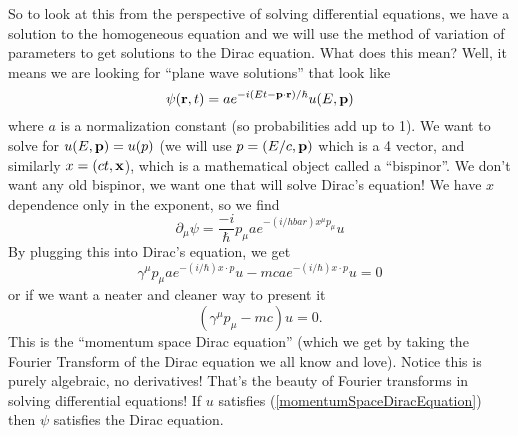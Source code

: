 So to look at this from the perspective of solving differential equations, we
have a solution to the homogeneous equation and we will use the method of variation
of parameters to get solutions to the Dirac equation. What does this mean? Well,
it means we are looking for ``plane wave solutions'' that look like
\begin{equation}
\psi(\bold{r},t) = ae^{-i(Et-\bold{p}\cdot\bold{r})/\hbar}u(E,\bold{p})
\end{equation}
where $a$ is a normalization constant (so probabilities add up to 1). We want to
solve for $u(E,\bold{p})=u(p)$ (we will use $p=(E/c,\bold{p})$ which is a 4 vector, and
similarly $x=(ct,\bold{x}$), which is a mathematical object called a ``bispinor''.
We don't want any old bispinor, we want one that will solve Dirac's equation!
We have $x$ dependence only in the exponent, so we find
\begin{equation}
\partial_\mu\psi = \frac{-i}{\hbar}p_\mu a e^{-(i/hbar)x^\mu p_\mu}u
\end{equation}
By plugging this into Dirac's equation, we get
\begin{equation}
\gamma^\mu p_\mu a e^{-(i/\hbar)x\cdot p}u - mcae^{-(i/\hbar)x\cdot p}u = 0
\end{equation}
or if we want a neater and cleaner way to present it
\begin{equation}\label{momentumSpaceDiracEquation}
(\gamma^\mu p_\mu - mc)u = 0.
\end{equation}
This is the ``momentum space Dirac equation'' (which we get by taking the
Fourier Transform of the Dirac equation we all know and love). Notice this is
purely algebraic, no derivatives! That's the beauty of Fourier transforms in
solving differential equations! If $u$ satisfies (\ref{momentumSpaceDiracEquation})
then $\psi$ satisfies the Dirac equation.

